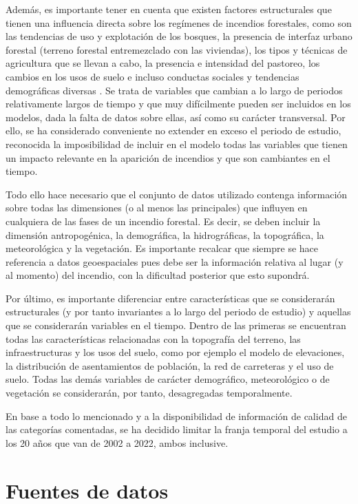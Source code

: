 \documentclass[12pt,a4paper,]{book}
\numberwithin{dummy}{section}
\theoremstyle{ocrenumbox}
\theoremstyle{blacknumex}
\theoremstyle{blacknumbox}
\theoremstyle{ocrenum}
\theoremstyle{ocrenum}
\begin{document}
Además, es importante tener en cuenta que existen factores estructurales
que tienen una influencia directa sobre los regímenes de incendios
forestales, como son las tendencias de uso y explotación de los bosques,
la presencia de interfaz urbano forestal (terreno forestal entremezclado
con las viviendas), los tipos y técnicas de agricultura que se llevan a
cabo, la presencia e intensidad del pastoreo, los cambios en los usos de
suelo e incluso conductas sociales y tendencias demográficas diversas
\citep{MataixCerda, pausas2020incendios}. Se trata de variables que
cambian a lo largo de periodos relativamente largos de tiempo y que muy
difícilmente pueden ser incluidos en los modelos, dada la falta de datos
sobre ellas, así como su carácter transversal. Por ello, se ha
considerado conveniente no extender en exceso el periodo de estudio,
reconocida la imposibilidad de incluir en el modelo todas las variables
que tienen un impacto relevante en la aparición de incendios y que son
cambiantes en el tiempo.

Todo ello hace necesario que el conjunto de datos utilizado contenga
información sobre todas las dimensiones (o al menos las principales) que
influyen en cualquiera de las fases de un incendio forestal. Es decir,
se deben incluir la dimensión antropogénica, la demográfica, la
hidrográficas, la topográfica, la meteorológica y la vegetación. Es
importante recalcar que siempre se hace referencia a datos geoespaciales
pues debe ser la información relativa al lugar (y al momento) del
incendio, con la dificultad posterior que esto supondrá.

Por último, es importante diferenciar entre características que se
considerarán estructurales (y por tanto invariantes a lo largo del
periodo de estudio) y aquellas que se considerarán variables en el
tiempo. Dentro de las primeras se encuentran todas las características
relacionadas con la topografía del terreno, las infraestructuras y los
usos del suelo, como por ejemplo el modelo de elevaciones, la
distribución de asentamientos de población, la red de carreteras y el
uso de suelo. Todas las demás variables de carácter demográfico,
meteorológico o de vegetación se considerarán, por tanto, desagregadas
temporalmente.

En base a todo lo mencionado y a la disponibilidad de información de
calidad de las categorías comentadas, se ha decidido limitar la franja
temporal del estudio a los 20 años que van de 2002 a 2022, ambos
inclusive.

\hypertarget{fuentes-de-datos}{%
\section{Fuentes de datos}\label{fuentes-de-datos}}
\end{document}
